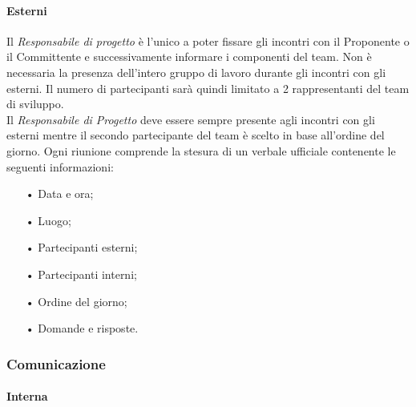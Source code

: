 \paragraph{Esterni}
Il \textit{Responsabile di progetto} è l'unico a poter fissare gli incontri con il Proponente o il Committente e successivamente 
informare i componenti del team. Non è necessaria la presenza dell'intero gruppo di lavoro durante gli incontri con gli esterni. 
Il numero di partecipanti sarà quindi limitato a 2 rappresentanti del team di sviluppo.  
\\
Il \textit{Responsabile di Progetto} deve essere sempre presente agli incontri con gli esterni mentre il secondo partecipante 
del team è scelto in base all'ordine del giorno. 
\newline
% 
Ogni riunione comprende la stesura di un verbale ufficiale contenente le seguenti informazioni:
\begin{itemize}
\item[•] Data e ora;
\item[•] Luogo;
\item[•] Partecipanti esterni;
\item[•] Partecipanti interni;
\item[•] Ordine del giorno;
\item[•] Domande e risposte.
\end{itemize}

\subsubsection{Comunicazione}

\paragraph{Interna}

